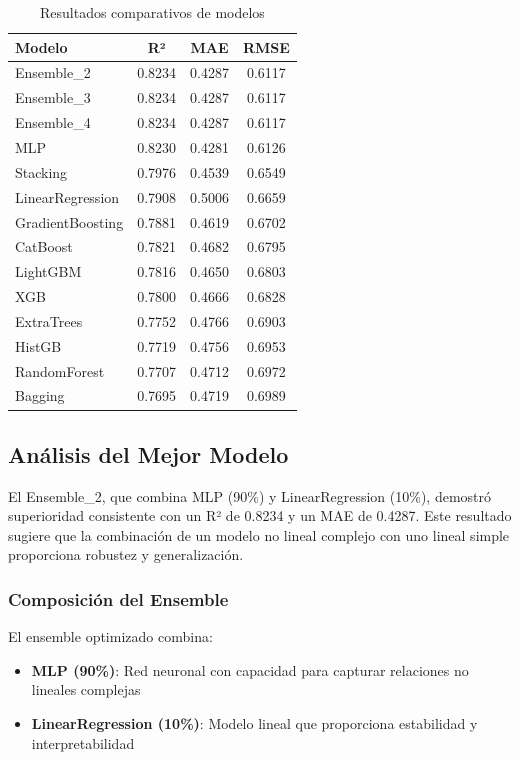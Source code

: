 \documentclass[conference]{IEEEtran}
\begin{document}
	\begin{table}[htbp]
		\centering
		\caption{Resultados comparativos de modelos}
		\label{tab:resultados}
		\begin{tabular}{|l|c|c|c|}
			\hline
			\textbf{Modelo} & \textbf{R²} & \textbf{MAE} & \textbf{RMSE} \\
			\hline
			Ensemble\_2 & 0.8234 & 0.4287 & 0.6117 \\
			\hline
			Ensemble\_3 & 0.8234 & 0.4287 & 0.6117 \\
			\hline
			Ensemble\_4 & 0.8234 & 0.4287 & 0.6117 \\
			\hline
			MLP & 0.8230 & 0.4281 & 0.6126 \\
			\hline
			Stacking & 0.7976 & 0.4539 & 0.6549 \\
			\hline
			LinearRegression & 0.7908 & 0.5006 & 0.6659 \\
			\hline
			GradientBoosting & 0.7881 & 0.4619 & 0.6702 \\
			\hline
			CatBoost & 0.7821 & 0.4682 & 0.6795 \\
			\hline
			LightGBM & 0.7816 & 0.4650 & 0.6803 \\
			\hline
			XGB & 0.7800 & 0.4666 & 0.6828 \\
			\hline
			ExtraTrees & 0.7752 & 0.4766 & 0.6903 \\
			\hline
			HistGB & 0.7719 & 0.4756 & 0.6953 \\
			\hline
			RandomForest & 0.7707 & 0.4712 & 0.6972 \\
			\hline
			Bagging & 0.7695 & 0.4719 & 0.6989 \\
			\hline
		\end{tabular}
	\end{table}
	
	\subsection{Análisis del Mejor Modelo}
	El Ensemble\_2, que combina MLP (90\%) y LinearRegression (10\%), demostró superioridad consistente con un R² de 0.8234 y un MAE de 0.4287. Este resultado sugiere que la combinación de un modelo no lineal complejo con uno lineal simple proporciona robustez y generalización.
	
	\subsubsection{Composición del Ensemble}
	El ensemble optimizado combina:
	\begin{itemize}
		\item \textbf{MLP (90\%)}: Red neuronal con capacidad para capturar relaciones no lineales complejas
		\item \textbf{LinearRegression (10\%)}: Modelo lineal que proporciona estabilidad y interpretabilidad
	\end{itemize}
	
\end{document}
